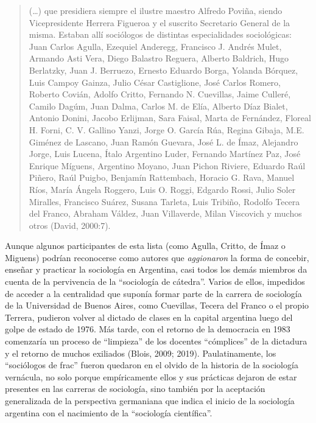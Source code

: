 \begin{quote}
(\dots) que presidiera siempre el ilustre maestro Alfredo Poviña, siendo Vicepresidente Herrera Figueroa y el suscrito Secretario General de la misma. Estaban allí sociólogos de distintas especialidades sociológicas: Juan Carlos Agulla, Ezequiel Anderegg, Francisco J. Andrés Mulet, Armando Asti Vera, Diego Balastro Reguera, Alberto Baldrich, Hugo Berlatzky, Juan J. Berruezo, Ernesto Eduardo Borga, Yolanda Bórquez, Luis Campoy Gainza, Julio César Castiglione, José Carlos Romero, Roberto Covián, Adolfo Critto, Fernando N. Cuevillas, Jaime Culleré, Camilo Dagúm, Juan Dalma, Carlos M. de Elía, Alberto Díaz Bialet, Antonio Donini, Jacobo Erlijman, Sara Faisal, Marta de Fernández, Floreal H. Forni, C. V. Gallino Yanzi, Jorge O. García Rúa, Regina Gibaja, M.E. Giménez de Lascano, Juan Ramón Guevara, José L. de Ímaz, Alejandro Jorge, Luis Lucena, Ítalo Argentino Luder, Fernando Martínez Paz, José Enrique Míguens, Argentino Moyano, Juan Pichon Riviere, Eduardo Raúl Piñero, Raúl Puigbo, Benjamín Rattembach, Horacio G. Rava, Manuel Ríos, María Ángela Roggero, Luis O. Roggi, Edgardo Rossi, Julio Soler Miralles, Francisco Suárez, Susana Tarleta, Luis Tribiño, Rodolfo Tecera del Franco, Abraham Váldez, Juan Villaverde, Milan Viscovich y muchos otros (David, 2000:7).
\end{quote}

Aunque algunos participantes de esta lista (como Agulla, Critto, de Ímaz o Miguens) podrían reconocerse como autores que \emph{aggionaron} la forma de concebir, enseñar y practicar la sociología en Argentina, casi todos los demás miembros da cuenta de la pervivencia de la \enquote{sociología de cátedra}. Varios de ellos, impedidos de acceder a la centralidad que suponía formar parte de la carrera de sociología de la Universidad de Buenos Aires, como Cuevillas, Tecera del Franco o el propio Terrera, pudieron volver al dictado de clases en la capital argentina luego del golpe de estado de 1976. Más tarde, con el retorno de la democracia en 1983 comenzaría un proceso de \enquote{limpieza} de los docentes \enquote{cómplices} de la dictadura y el retorno de muchos exiliados (Blois, 2009; 2019). Paulatinamente, los \enquote{sociólogos de frac} fueron quedaron en el olvido de la historia de la sociología vernácula, no solo porque empíricamente ellos y sus prácticas dejaron de estar presentes en las carreras de sociología, sino también por la aceptación generalizada de la perspectiva germaniana que indica el inicio de la sociología argentina con el nacimiento de la \enquote{sociología científica}.


